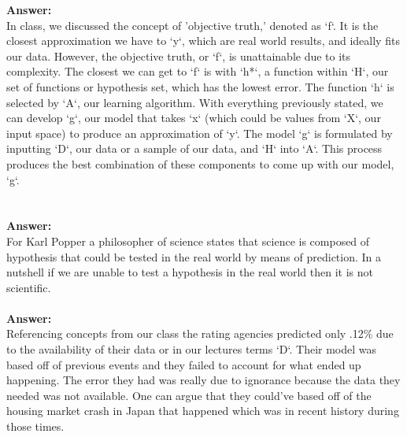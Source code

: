 \documentclass[12pt]{article}
\begin{document}
\begin{enumerate}
\textbf{Answer:} \\ In class, we discussed the concept of 'objective truth,' denoted as `f`. It is the closest approximation we have to `y`, which are real world results, and ideally fits our data. However, the objective truth, or `f`, is unattainable due to its complexity. The closest we can get to `f` is with `h*`, a function within `H`, our set of functions or hypothesis set, which has the lowest error. The function `h` is selected by `A`, our learning algorithm. With everything previously stated, we can develop `g`, our model that takes `x` (which could be values from `X`, our input space) to produce an approximation of `y`. The model `g` is formulated by inputting `D`, our data or a sample of our data, and `H` into `A`. This process produces the best combination of these components to come up with our model, `g`. \\ \\

 \\

\textbf{Answer:}\\
For Karl Popper a philosopher of science states that science is composed of hypothesis that could be tested in the real world by means of prediction. In a nutshell if we are unable to test a hypothesis in the real world then it is not scientific. \\

 \\

\textbf{Answer:}\\
Referencing concepts from our class the rating agencies predicted only .12\% due to the availability of their data or in our lectures terms `D`. Their model was based off of previous events and they failed to account for what ended up happening. The error they had was really due to ignorance because the data they needed was not available. One can argue that they could've based off of the housing market crash in Japan that happened which was in recent history during those times. \\

\\


\end{enumerate}
\end{document}
